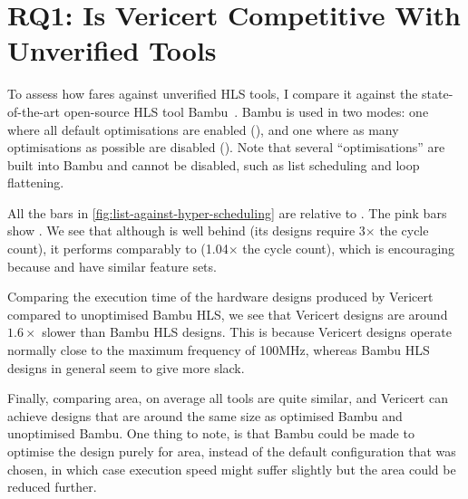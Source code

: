 
\section{RQ1: Is Vericert Competitive With Unverified Tools}

To assess how \VericertHyper{} fares against unverified HLS tools, I compare it
against the state-of-the-art open-source HLS tool
Bambu~\cite[]{ferrandi21_bambu}. Bambu is used in two modes: one where all
default optimisations are enabled (\BambuDefault{}), and one where as many
optimisations as possible are disabled (\BambuNoOpt{}). Note that several
\enquote{optimisations} are built into Bambu and cannot be disabled, such as
list scheduling and loop flattening.

All the bars in \cref{fig:list-against-hyper-scheduling} are relative to
\BambuDefault. The pink bars show \BambuNoOpt. We see that although
\VericertHyper{} is well behind \BambuDefault{} (its designs require 3$\times$
the cycle count), it performs comparably to \BambuNoOpt{} (1.04$\times$ the
cycle count), which is encouraging because \VericertHyper{} and \BambuNoOpt{}
have similar feature sets.

Comparing the execution time of the hardware designs produced by Vericert
compared to unoptimised Bambu HLS, we see that Vericert designs are around
$1.6\times$ slower than Bambu HLS designs.  This is because Vericert designs
operate normally close to the maximum frequency of 100MHz, whereas Bambu HLS
designs in general seem to give more slack.

Finally, comparing area, on average all tools are quite similar, and Vericert
can achieve designs that are around the same size as optimised Bambu and
unoptimised Bambu.  One thing to note, is that Bambu could be made to optimise
the design purely for area, instead of the default configuration that was
chosen, in which case execution speed might suffer slightly but the area could
be reduced further.

